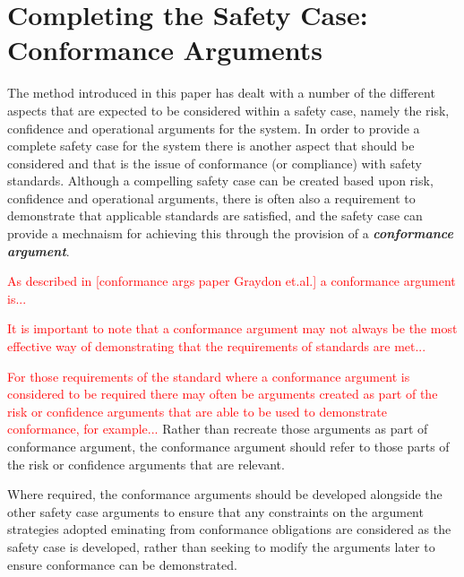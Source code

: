 \section{Completing the Safety Case: Conformance Arguments}
\label{sec:conform}

The method introduced in this paper has dealt with a number of the different aspects that are expected to be considered within a safety case, namely the risk, confidence and operational arguments for the system. In order to provide a complete safety case for the system there is another aspect that should be considered and that is the issue of conformance (or compliance) with safety standards. Although a compelling safety case can be created based upon risk, confidence and operational arguments, there is often also a requirement to demonstrate that applicable standards are satisfied, and the safety case can provide a mechnaism for achieving this through the provision of a \textbf{\textit{conformance argument}}. 

\textcolor{red}{As described in [conformance args paper Graydon et.al.] a conformance argument is...}

\textcolor{red}{It is important to note that a conformance argument may not always be the most effective way of demonstrating that the requirements of standards are met...}

\textcolor{red}{For those requirements of the standard where a conformance argument is considered to be required there may often be arguments created as part of the risk or confidence arguments that are able to be used to demonstrate conformance, for example... }
Rather than recreate those arguments as part of conformance argument, the conformance argument should refer to those parts of the risk or confidence arguments that are relevant.

Where required, the conformance arguments should be developed alongside the other safety case arguments to ensure that any constraints on the argument strategies adopted eminating from conformance obligations are considered as the safety case is developed, rather than seeking to modify the arguments later to ensure conformance can be demonstrated. 